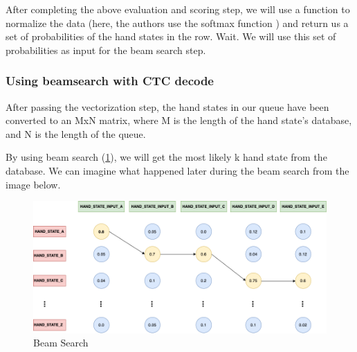       
After completing the above evaluation and scoring step, we will use a function to normalize the data (here, the authors use the softmax function \cite{SoftMax}) and return us a set of probabilities of the hand states in the row. Wait. We will use this set of probabilities as input for the beam search step.

\subsubsection{ Using beamsearch with CTC decode }

After passing the vectorization step, the hand states in our queue have been converted to an MxN matrix, where M is the length of the hand state's database, and N is the length of the queue.

By using beam search (\ref{fig:Chap4-BeamSearch}), we will get the most likely k hand state from the database. We can imagine what happened later during the beam search from the image below.

      


\begin{figure}[H]
  \centering
  \includegraphics[width=\textwidth]{img/Chap4/BeamSearch.png}
  \caption{ Beam Search }
  \label{fig:Chap4-BeamSearch}
\end{figure}

